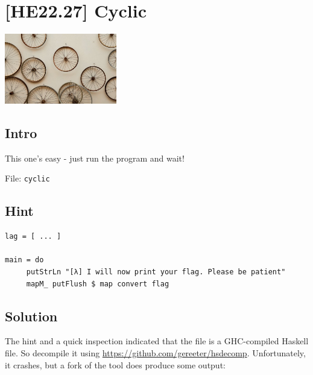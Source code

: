 
\hypertarget{he22.27}{%
\chapter{[HE22.27] Cyclic}\label{he22.27}}

\begin{marginfigure}
	\includegraphics[width=49mm]{level6/challenge27.jpg}
\end{marginfigure}
\section{Intro}
This one's easy - just run the program and wait!

File: \verb+cyclic+
\section{Hint}
\begin{verbatim}
lag = [ ... ]  
  
main = do  
     putStrLn "[λ] I will now print your flag. Please be patient"  
     mapM_ putFlush $ map convert flag  
\end{verbatim}
\section{Solution}\label{hv22.27solution}

The hint and a quick inspection indicated that the file is a GHC-compiled Haskell file.  So decompile it using \url{https://github.com/gereeter/hsdecomp}.  Unfortunately, it crashes, but a fork of the tool does produce some output:

